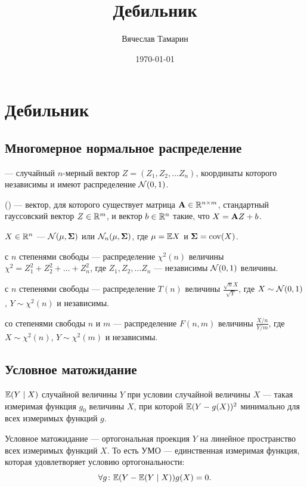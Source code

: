 \documentclass[11pt]{book}
\title{Дебильник}
\date{\today}
\author{Вячеслав Тамарин}
\begin{document}
\chapter{Дебильник}
\section{Многомерное нормальное распределение}
\begin{definition}
	 --- случайный $n$-мерный вектор $ Z = (Z_1, Z_2, \ldots Z_{n})$, координаты которого независимы и имеют распределение $ \mathcal{N}(0, 1)$.
\end{definition}

\begin{definition}[]
	 () --- вектор, для которого существует матрица $ {\bf A} \in \mathbb{R}^{n \times m} $, стандартный гауссовский вектор $ Z \in \mathbb{R}^{m}$, и вектор $ b \in \mathbb{R}^{n}$ такие, что $ X = {\bf A}Z + b $.
\end{definition}

\begin{definition}[]
	 $ X \in \mathbb{R}^{n}$ --- $ \mathcal{N}(\mu, {\bf \Sigma}) $ или $ \mathcal{N}_n(\mu, {\bf \Sigma}) $, где $ \mu = \mathbb{E} X$ и $ {\bf \Sigma} = \operatorname{cov}(X) $.
\end{definition}

\begin{definition}[]
	 с $ n$ степенями свободы --- распределение $ \chi^2(n) $ величины $ \chi^2 = Z_1^2 + Z_2^2 + \ldots + Z_{n}^2 $, где $ Z_{1}, Z_2, \ldots Z_{n}$ --- независимы $ \mathcal{N}(0, 1)$ величины. 
\end{definition}

\begin{definition}[]
	 с $n$ степенями свободы --- распределение $T(n)$ величины $\frac{\sqrt{n}X}{\sqrt{Y}}$, где $X \sim \mathcal{N}(0, 1)$, $Y \sim \chi^2(n)$ и независимы.
\end{definition}

\begin{definition}[]
	 со степенями свободы $n$ и $m$ --- распределение $F(n, m)$ величины $\frac{X / n}{Y / m}$, где $X \sim \chi^2(n)$, $Y \sim \chi^2(m)$ и независимы.
\end{definition}

\section{Условное матожидание}
\begin{definition}[]
	 $\mathbb{E} (Y \mid X)$ случайной величины $Y$ при условии случайной величины $X$ --- такая измеримая функция $g_0$ величины $X$, при которой $\mathbb{E}(Y - g(X))^2$ минимально для всех измеримых функций $g$.
\end{definition}
Условное матожидание --- ортогональная проекция $Y$ на линейное пространство всех измеримых функций $X$. То есть УМО --- единственная измеримая функция, которая удовлетворяет условию ортогональности:
 \[
\forall g \colon\mathbb{E}(Y - \mathbb{E}(Y \mid X)) g(X) = 0
.\] 
\end{document}

